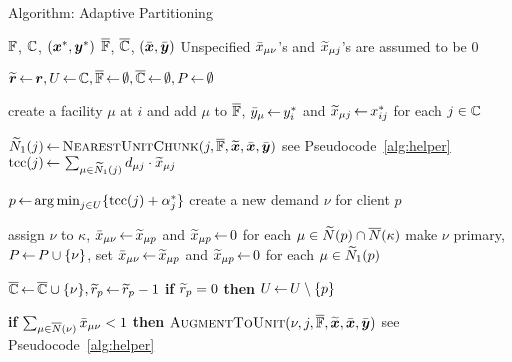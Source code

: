 \documentclass[11pt]{article}
\begin{document}
\begin{algorithm}[ht]
  \caption{Algorithm: Adaptive Partitioning}
  \label{alg:lpr2}
  \begin{algorithmic}[1]
    \Require $\mathbb{F}$, $\mathbb{C}$, $(\boldsymbol{x}^\ast,\boldsymbol{y}^\ast)$
    \Ensure  $\overline{\mathbb{F}}$,  $\overline{\mathbb{C}}$, $(\bar{\boldsymbol{x}}, \bar{\boldsymbol{y}})$ 
    \Comment Unspecified ${\bar x}_{\mu \nu}$'s and ${\widetilde x}_{\mu j}$'s are assumed to be $0$

    \State $\widetilde{\boldsymbol{r}} {\,\leftarrow\,} \boldsymbol{r}, U{\,\leftarrow\,} \mathbb{C}, \overline{\mathbb{F}}{\,\leftarrow\,} \emptyset,
    \overline{\mathbb{C}}{\,\leftarrow\,} \emptyset, P{\,\leftarrow\,} \emptyset$

    \State create a facility $\mu$ at $i$ and add $\mu$ to $\overline{\mathbb{F}}$,
    ${\bar y}_\mu {\,\leftarrow\,} y_i^\ast$ and ${\widetilde x}_{\mu j}{\,\leftarrow\,}
    x_{ij}^\ast$ for each $j\in\mathbb{C}$ 
    \EndFor

    \State ${\widetilde N}_1(j) {\,\leftarrow\,} {{\textsc{NearestUnitChunk}}}(j, \overline{\mathbb{F}}, \widetilde{\boldsymbol{x}}, \bar{\boldsymbol{x}}, \bar{\boldsymbol{y}})$ \Comment see Pseudocode~\ref{alg:helper}
    \State $\textrm{tcc}(j){\,\leftarrow\,} \sum_{\mu\in {\widetilde N}_1(j)} d_{{\mu}j}\cdot {\widetilde x}_{\mu j}$
    \EndFor
 
    \State $p {\,\leftarrow\,} {\operatorname*{arg\,min}}_{j\in U}\{ \textrm{tcc}(j)+\alpha_j^\ast \}$
    \State create a new demand $\nu$ for client $p$

    \State assign $\nu$ to $\kappa$,
    ${\bar x}_{\mu \nu}{\,\leftarrow\,} {\widetilde x}_{\mu p}$ and ${\widetilde x}_{\mu p}{\,\leftarrow\,} 0$ for each $\mu \in {\widetilde N}(p) \cap {\overline{N}}(\kappa)$
    \Else 
    \State make $\nu$ primary, $P {\,\leftarrow\,} P \cup \{\nu\}$,
    set ${\bar x}_{\mu\nu} {\,\leftarrow\,} {\widetilde x}_{\mu p}$ and ${\widetilde x}_{\mu p}{\,\leftarrow\,} 0$ for each $\mu\in {\widetilde N}_1(p)$

    \EndIf
    \State $\overline{\mathbb{C}}{\,\leftarrow\,} \overline{\mathbb{C}}\cup \{\nu\},
    {\widetilde r}_p {\,\leftarrow\,} {\widetilde r}_p -1$
	\State \textbf{if} {${\widetilde r}_p=0$} \textbf{then} $U{\,\leftarrow\,} U \setminus \{p\}$
    \EndWhile

     
        
    \State \textbf{if} $\sum_{\mu\in {\overline{N}}(\nu)}{\bar x}_{\mu\nu}<1$
    \textbf{then} ${\textsc{AugmentToUnit}}(\nu, j, \overline{\mathbb{F}}, \widetilde{\boldsymbol{x}}, \bar{\boldsymbol{x}}, \bar{\boldsymbol{y}})$ \Comment see Pseudocode~\ref{alg:helper}
    \EndFor
    \EndFor
  \end{algorithmic}
\end{algorithm}
\end{document}
